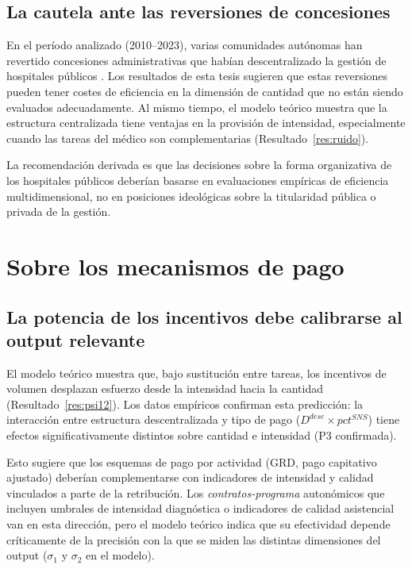 \documentclass[12pt, a4paper, twoside, openright]{book}
\theoremstyle{plain}
\theoremstyle{definition}
\theoremstyle{remark}
\begin{document}
\subsection{La cautela ante las reversiones de concesiones}

En el período analizado (2010--2023), varias comunidades autónomas han revertido concesiones administrativas que habían descentralizado la gestión de hospitales públicos \citep{repullo2008}. Los resultados de esta tesis sugieren que estas reversiones pueden tener costes de eficiencia en la dimensión de cantidad que no están siendo evaluados adecuadamente. Al mismo tiempo, el modelo teórico muestra que la estructura centralizada tiene ventajas en la provisión de intensidad, especialmente cuando las tareas del médico son complementarias (Resultado~\ref{res:ruido}).

La recomendación derivada es que las decisiones sobre la forma organizativa de los hospitales públicos deberían basarse en evaluaciones empíricas de eficiencia multidimensional, no en posiciones ideológicas sobre la titularidad pública o privada de la gestión.

\section{Sobre los mecanismos de pago}

\subsection{La potencia de los incentivos debe calibrarse al output relevante}

El modelo teórico muestra que, bajo sustitución entre tareas, los incentivos de volumen desplazan esfuerzo desde la intensidad hacia la cantidad (Resultado~\ref{res:psi12}). Los datos empíricos confirman esta predicción: la interacción entre estructura descentralizada y tipo de pago ($D^{desc}\times pct^{SNS}$) tiene efectos significativamente distintos sobre cantidad e intensidad (P3 confirmada).

Esto sugiere que los esquemas de pago por actividad (GRD, pago capitativo ajustado) deberían complementarse con indicadores de intensidad y calidad vinculados a parte de la retribución. Los \textit{contratos-programa} autonómicos que incluyen umbrales de intensidad diagnóstica o indicadores de calidad asistencial van en esta dirección, pero el modelo teórico indica que su efectividad depende críticamente de la precisión con la que se miden las distintas dimensiones del output ($\sigma_1$ y $\sigma_2$ en el modelo).
\end{document}
